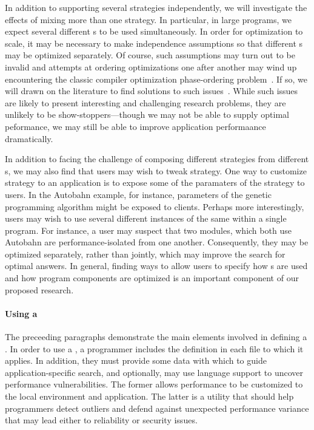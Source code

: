 In addition to supporting several strategies independently, we will 
investigate the effects of mixing more than one strategy.  In particular,
in large programs, we expect several different \rasp{}s to be used simultaneously.
In order for optimization to scale, it may be necessary to make independence assumptions
so that different \rasp{}s may be optimized separately.  Of course, such assumptions
may turn out to be invalid and attempts at ordering optimizations one after another
may wind up encountering the classic compiler optimization phase-ordering 
problem~\cite{Click:combining-optimizations,Vegdahl:phase-coupling}. 
 If so, we will drawn on the literature
to find solutions to such issues~\cite{Kulkarni:phase-ordering-search,Kulkarni:phase-ordering}.  While such issues are likely to present interesting
and challenging research problems, they are unlikely to be show-stoppers---though we may not
be able to supply optimal peformance, we may still be able to improve application performaance
dramatically.

In addition to facing the challenge of composing different strategies from different \rasp{}s, 
we may also find that users may wish to tweak \rasp{} strategy.  One way to customize \rasp{}
strategy to an application is to expose some of the paramaters of the \rasp{} strategy to users.
In the Autobahn example, for instance, parameters of the genetic programming algorithm might
be exposed to clients.  Perhaps more interestingly, users may wish to use several different 
instances of the same \rasp{} within a single program.  For instance, a user may suspect that
two modules, which both use Autobahn are performance-isolated from one another.  Consequently,
they may be optimized separately, rather than jointly, which may improve the search for
optimal answers.  In general, finding ways to allow users to specify how \rasp{}s are used and how program
components are optimized is an important component of our proposed research.

\paragraph*{Using a \rasp{}}
The preceeding paragraphs demonstrate the main elements involved in
defining a \rasp.  In order to use a \rasp, a programmer includes
the \rasp{} definition in each file to which it applies.  In addition, they
must provide some data with which to guide application-specific search,
and optionally, may use language support to uncover performance vulnerabilities.
The former allows performance to be customized to the local environment and application.
The latter is a utility that should help programmers detect outliers and defend against
unexpected performance variance that may lead either to reliability or security issues.

